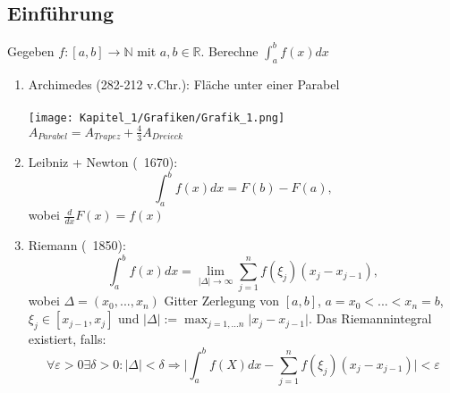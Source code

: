 \subsection{Einführung}

\begin{problem}
Gegeben $f: [a,b] \rightarrow \mathbb{N}$ mit $a, b \in \mathbb{R}$.
Berechne $\int_a^b f(x) dx $
\end{problem}

\begin{example}
\begin{description}
  \item 
\end{description}
\begin{enumerate}
  \item Archimedes (282-212 v.Chr.): Fläche unter einer Parabel \\ \\
    \texttt{[image: Kapitel\_1/Grafiken/Grafik\_1.png]} \\
    $A_{Parabel} = A_{Trapez} + \frac{4}{3} A_{Dreieck}$
  \item Leibniz + Newton (~1670):
    $$ \int_a^b f(x) dx = F(b) - F(a),$$ wobei $\frac{d}{dx} F(x) = f(x)$
  \item Riemann (~1850): 
    $$ \int_a^b f(x) dx = \lim\limits_{\vert \Delta \vert \to \infty} \sum_{j=1}^n f(\xi_j)(x_j - x_{j-1}),$$
    wobei $\Delta = (x_0,...,x_n)$ Gitter Zerlegung von $[a, b]$, $a=x_0 < ...< x_n = b$, $\xi_j \in [x_{j-1}, x_j]$ und $\vert \Delta \vert := \max_{j=1,...n} \vert x_j - x_{j-1} \vert$.
    Das Riemannintegral existiert, falls: 
    $$ \forall \varepsilon > 0 \exists \delta > 0: \vert \Delta \vert < \delta \Rightarrow \vert \int_a^b f(X) dx - \sum_{j=1}^n f(\xi_j)(x_j-x_{j-1}) \vert < \varepsilon $$
\end{enumerate}
\end{example}

